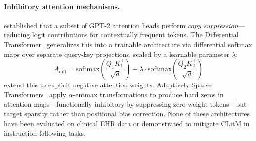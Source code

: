 \documentclass{article}
\begin{document}
\paragraph{Inhibitory attention mechanisms.}
\citet{mcdougall2023copy} established that a subset of GPT-2 attention heads perform
\emph{copy suppression}---reducing logit contributions for contextually frequent tokens.
The Differential Transformer~\cite{ye2025differential} generalizes this into a trainable
architecture via differential softmax maps over separate query-key projections,
scaled by a learnable parameter $\lambda$:
\begin{equation}
  A_\mathrm{diff} = \mathrm{softmax}\!\left(\frac{Q_1 K_1^\top}{\sqrt{d}}\right)
    - \lambda \cdot \mathrm{softmax}\!\left(\frac{Q_2 K_2^\top}{\sqrt{d}}\right)
  \label{eq:diffattn}
\end{equation}
\citet{lv2024negative} extend this to explicit negative attention weights.
Adaptively Sparse Transformers~\cite{correia2019adaptively} apply $\alpha$-entmax
transformations to produce hard zeros in attention maps---functionally inhibitory
by suppressing zero-weight tokens---but target sparsity rather than positional
bias correction.
None of these architectures have been evaluated on clinical EHR data or
demonstrated to mitigate CLitM in instruction-following tasks.
\end{document}
